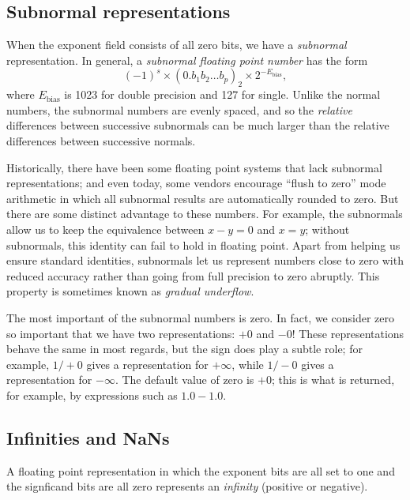 \subsection{Subnormal representations}

When the exponent field consists of all zero bits, we have a
{\em subnormal} representation.
In general, a {\em subnormal floating point number} has the form
\[
  (-1)^s \times (0.b_1 b_2 \ldots b_p)_2 \times 2^{-E_{\mathrm{bias}}},
\]
where $E_{\mathrm{bias}}$ is 1023 for double precision and 127
for single.  Unlike the normal numbers, the subnormal numbers are
evenly spaced, and so the {\em relative} differences between
successive subnormals can be much larger than the relative differences
between successive normals.

Historically, there have been some floating point systems that lack
subnormal representations; and even today, some vendors encourage
``flush to zero'' mode arithmetic in which all subnormal results are
automatically rounded to zero.  But there are some distinct advantage
to these numbers.  For example, the subnormals allow us to keep the
equivalence between $x-y = 0$ and $x = y$; without subnormals, this
identity can fail to hold in floating point.  Apart from helping us
ensure standard identities, subnormals let us represent numbers close
to zero with reduced accuracy rather than going from full precision to
zero abruptly.  This property is sometimes known as {\em gradual underflow}.

The most important of the subnormal numbers is zero.  In fact, we consider
zero so important that we have two representations: $+0$ and $-0$!
These representations behave the same in most regards, but the sign
does play a subtle role; for example, $1/+0$ gives a representation
for $+\infty$, while $1/-0$ gives a representation for $-\infty$.
The default value of zero is $+0$; this is what is returned, for example,
by expressions such as $1.0-1.0$.

\subsection{Infinities and NaNs}

A floating point representation in which the exponent bits are all
set to one and the signficand bits are all zero represents
an {\em infinity} (positive or negative).

